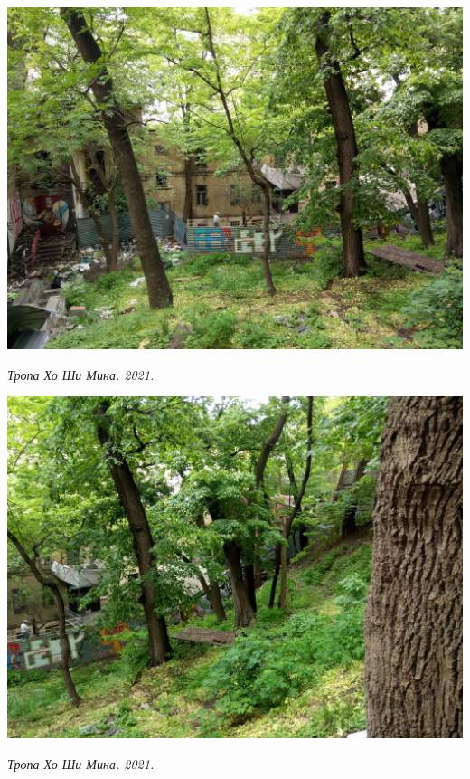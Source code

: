 \begin{center}
\includegraphics[width=\linewidth]{rpix/IMG_20210601_134940.jpg}

\textit{Тропа Хо Ши Мина. 2021.}
\end{center}



\begin{center}
\includegraphics[width=\linewidth]{rpix/IMG_20210601_134942.jpg}

\textit{Тропа Хо Ши Мина. 2021.}
\end{center}




